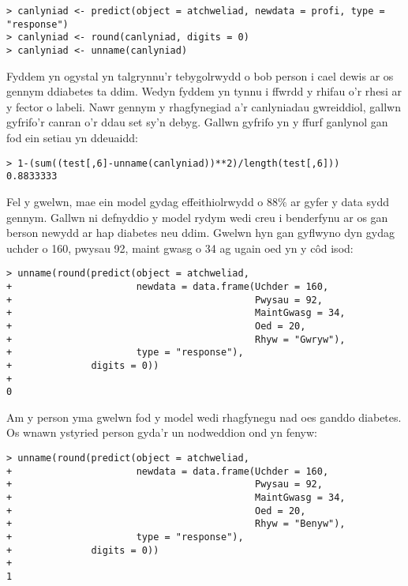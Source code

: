 \begin{verbatim}
> canlyniad <- predict(object = atchweliad, newdata = profi, type = "response")
> canlyniad <- round(canlyniad, digits = 0)
> canlyniad <- unname(canlyniad)
\end{verbatim}

Fyddem yn ogystal yn talgrynnu'r tebygolrwydd o bob person i cael dewis ar os gennym ddiabetes ta ddim. Wedyn fyddem yn tynnu i ffwrdd y rhifau o'r rhesi ar y fector o labeli. Nawr gennym y rhagfynegiad a'r canlyniadau gwreiddiol, gallwn gyfrifo'r canran o'r ddau set sy'n debyg. Gallwn gyfrifo yn y ffurf ganlynol gan fod ein setiau yn ddeuaidd:

\begin{verbatim}
> 1-(sum((test[,6]-unname(canlyniad))**2)/length(test[,6]))
0.8833333
\end{verbatim}

Fel y gwelwn, mae ein model gydag effeithiolrwydd o $88\%$ ar gyfer y data sydd gennym. Gallwn ni defnyddio y model rydym wedi creu i benderfynu ar os gan berson newydd ar hap diabetes neu ddim. Gwelwn hyn gan gyflwyno dyn gydag uchder o 160, pwysau 92, maint gwasg o 34 ag ugain oed yn y c\^{o}d isod: 

\begin{verbatim}
> unname(round(predict(object = atchweliad, 
+                      newdata = data.frame(Uchder = 160,
+                                           Pwysau = 92, 
+                                           MaintGwasg = 34, 
+                                           Oed = 20, 
+                                           Rhyw = "Gwryw"), 
+                      type = "response"),
+              digits = 0))
+ 
0
\end{verbatim}

Am y person yma gwelwn fod y model wedi rhagfynegu nad oes ganddo diabetes. Os wnawn ystyried person gyda'r un nodweddion ond yn fenyw:

\begin{verbatim}
> unname(round(predict(object = atchweliad,
+                      newdata = data.frame(Uchder = 160,
+                                           Pwysau = 92, 
+                                           MaintGwasg = 34, 
+                                           Oed = 20, 
+                                           Rhyw = "Benyw"), 
+                      type = "response"),
+              digits = 0))
+ 
1
\end{verbatim}

